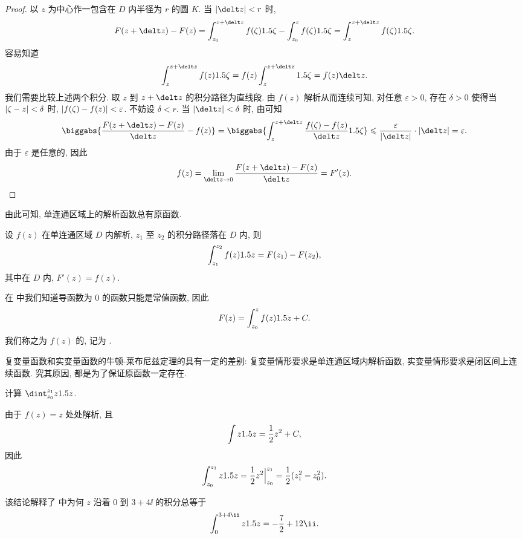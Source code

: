\begin{proof}
  以 $z$ 为中心作一包含在 $D$ 内半径为 $r$ 的圆 $K$.
  当 $\abs{\delt z}<r$ 时,
  \[
     F(z+\delt z)-F(z)
    =\int_{z_0}^{z+\delt z}f(\zeta)\d\zeta-\int_{z_0}^zf(\zeta)\d\zeta
    =\int_z^{z+\delt z}f(\zeta)\d\zeta.
  \]
  容易知道
  \[
     \int_z^{z+\delt z}f(z)\d\zeta
    =f(z)\int_z^{z+\delt z}\d\zeta=f(z)\delt z.
  \]
  我们需要比较上述两个积分.
  取 $z$ 到 $z+\delt z$ 的积分路径为直线段.
  由 $f(z)$ 解析从而连续可知, 对任意 $\varepsilon>0$, 存在 $\delta>0$ 使得当 $\left|\zeta-z\right|<\delta$ 时, $\left|f(\zeta)-f(z)\right|<\varepsilon$.
  不妨设 $\delta<r$.
  当 $\abs{\delt z}<\delta$ 时, 由\thmGrowUp 可知
  \[
     \biggabs{\frac{F(z+\delt z)-F(z)}{\delt z}-f(z)}
    =\biggabs{\int_z^{z+\delt z}\frac{f(\zeta)-f(z)}{\delt z}\d \zeta}
    \le\frac{\varepsilon}{\abs{\delt z}}\cdot\abs{\delt z}
    =\varepsilon.
  \]
  由于 $\varepsilon$ 是任意的, 因此
  \[
    f(z)=\lim_{\delt z\ra 0}\frac{F(z+\delt z)-F(z)}{\delt z}=F'(z).\qedhere
  \]
\end{proof}

由此可知, \alert{单连通区域上的解析函数总有原函数}.

\begin{theorem}
  设 $f(z)$ 在单连通区域 $D$ 内解析, $z_1$ 至 $z_2$ 的积分路径落在 $D$ 内, 则
  \[
    \int_{z_1}^{z_2}f(z)1.5 z=F(z_1)-F(z_2),
  \]
  其中在 $D$ 内, $F'(z)=f(z)$.
\end{theorem}

在 中我们知道导函数为 $0$ 的函数只能是常值函数, 因此
\[
  F(z)=\int_{z_0}^zf(z)1.5 z+C.
\]
我们称之为 $f(z)$ 的, 记为 .

复变量函数和实变量函数的牛顿-莱布尼兹定理的具有一定的差别:
复变量情形要求是\alert{单连通区域内解析函数}, 实变量情形要求是\alert{闭区间上连续函数}.
究其原因, 都是为了保证原函数一定存在.

\begin{example}
  计算 $\dint_{z_0}^{z_1}z\d z$.
\end{example}

\begin{solution}
  由于 $f(z)=z$ 处处解析, 且
  \[
    \int z1.5 z=\frac{1}{2}  z^2+C,
  \]
  因此
  \[
     \int_{z_0}^{z_1}z1.5 z
    =\frac{1}{2} z^2\Big|_{z_0}^{z_1}
    =\frac{1}{2} (z_1^2-z_0^2).
  \]
\end{solution}

该结论解释了 中为何 $z$ 沿着 $0$ 到 $3+4\ii$ 的积分总等于
\[
  \int_0^{3+4\ii}z\d z=-\frac72+12\ii.
\]

